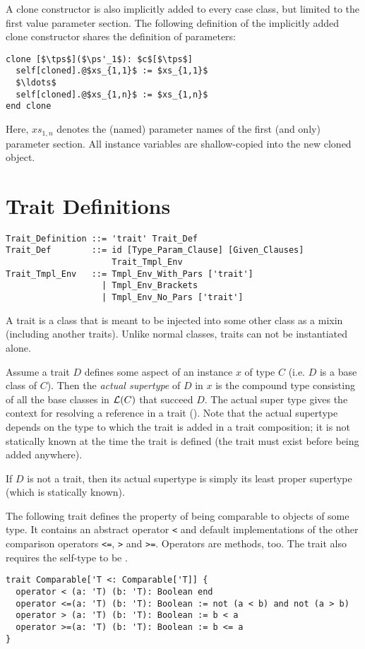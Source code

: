 A clone constructor is also implicitly added to every case class, but limited to the first value parameter section. The following definition of the implicitly added clone constructor shares the definition of parameters: 
\begin{lstlisting}
clone [$\tps$]($\ps'_1$): $c$[$\tps$]
  self[cloned].@$xs_{1,1}$ := $xs_{1,1}$
  $\ldots$
  self[cloned].@$xs_{1,n}$ := $xs_{1,n}$
end clone
\end{lstlisting}
Here, $xs_{1,n}$ denotes the (named) parameter names of the first (and only) parameter section. All instance variables are shallow-copied into the new cloned object. 






\section{Trait Definitions}
\label{sec:traits}

\grammar\begin{lstlisting}
Trait_Definition ::= 'trait' Trait_Def
Trait_Def        ::= id [Type_Param_Clause] [Given_Clauses]
                     Trait_Tmpl_Env
Trait_Tmpl_Env   ::= Tmpl_Env_With_Pars ['trait']
                   | Tmpl_Env_Brackets
                   | Tmpl_Env_No_Pars ['trait']
\end{lstlisting}

A trait is a class that is meant to be injected into some other class as a mixin (including another traits). Unlike normal classes, traits can not be instantiated alone. 

Assume a trait $D$ defines some aspect of an instance $x$ of type $C$ (i.e. $D$ is a base class of $C$). Then the {\em actual supertype} of $D$ in $x$ is the compound type consisting of all the base classes in ${\cal L}(C)$ that succeed $D$. The actual super type gives the context for resolving a  reference in a trait (). Note that the actual supertype depends on the type to which the trait is added in a trait composition; it is not statically known at the time the trait is defined (the trait must exist before being added anywhere). 

If $D$ is not a trait, then its actual supertype is simply its least proper supertype (which is statically known). 

\example The following trait defines the property of being comparable to objects of some type. It contains an abstract operator \lstinline!<! and default implementations of the other comparison operators \lstinline!<=!, \lstinline!>! and \lstinline!>=!. Operators are methods, too. The trait also requires the self-type to be . 
\begin{lstlisting}
trait Comparable['T <: Comparable['T]] {
  operator < (a: 'T) (b: 'T): Boolean end
  operator <=(a: 'T) (b: 'T): Boolean := not (a < b) and not (a > b)
  operator > (a: 'T) (b: 'T): Boolean := b < a
  operator >=(a: 'T) (b: 'T): Boolean := b <= a
}
\end{lstlisting}





